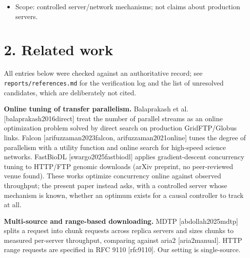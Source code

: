 \documentclass[10pt,a4paper]{article}
\begin{document}
\begin{itemize}
\begin{enumerate}
\item An engine ablation showing that a whole-request timeout and missing straggler splitting, not control, explained aria2's lead under the cap, after which the best fixed configuration beat the adaptive controllers (\textbf{Confirmed}, §7a); and a live-rate control server showing that the large-range advantage depends on the server fixing a response's rate on arrival (§9c).
\item An inventory of learned-policy experiments (§9): the early candidates are negative or descriptive; agents retrained for the capped server beat the fixed configuration with their own range size where trained, generalized partially inside a broadened training envelope, and failed a no-harm check on public mirrors (§8a).
\end{enumerate}
\item Scope: controlled server/network mechanisms; not claims about production servers.
\end{itemize}

\section*{2. Related work}

All entries below were checked against an authoritative record; see \texttt{reports/\allowbreak{}references.md} for the verification log and the list of unresolved candidates, which are deliberately not cited.


\textbf{Online tuning of transfer parallelism.} Balaprakash et al. [balaprakash2016direct] treat the number of parallel streams as an online optimization problem solved by direct search on production GridFTP/Globus links. Falcon [arifuzzaman2023falcon, arifuzzaman2021online] tunes the degree of parallelism with a utility function and online search for high-speed science networks. FastBioDL [swargo2025fastbiodl] applies gradient-descent concurrency tuning to HTTP/FTP genomic downloads (arXiv preprint, no peer-reviewed venue found). These works optimize concurrency online against observed throughput; the present paper instead asks, with a controlled server whose mechanism is known, whether an optimum exists for a causal controller to track at all.


\textbf{Multi-source and range-based downloading.} MDTP [abdollah2025mdtp] splits a request into chunk requests across replica servers and sizes chunks to measured per-server throughput, comparing against aria2 [aria2manual]. HTTP range requests are specified in RFC 9110 [rfc9110]. Our setting is single-source.
\end{document}
